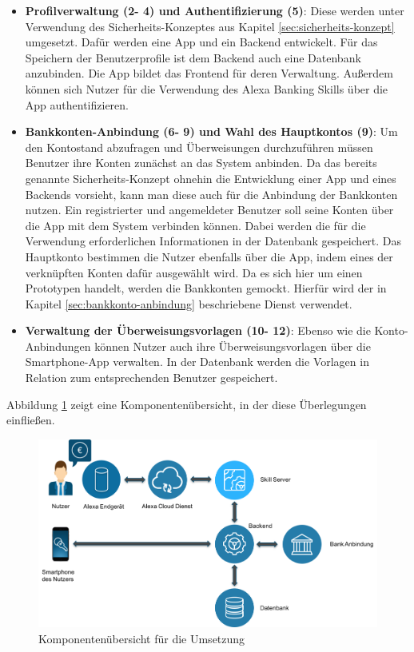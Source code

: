 \begin{itemize}
    \item \textbf{Profilverwaltung (2- 4) und Authentifizierung (5)}: Diese werden unter Verwendung des Sicherheits-Konzeptes aus Kapitel \ref{sec:sicherheits-konzept} umgesetzt. Dafür werden eine App und ein Backend entwickelt. Für das Speichern der Benutzerprofile ist dem Backend auch eine Datenbank anzubinden. Die App bildet das Frontend für deren Verwaltung. Außerdem können sich Nutzer für die Verwendung des Alexa Banking Skills über die App authentifizieren. 
    
    \item \textbf{Bankkonten-Anbindung (6- 9) und Wahl des Hauptkontos (9)}: Um den Kontostand abzufragen und Überweisungen durchzuführen müssen Benutzer ihre Konten zunächst an das System anbinden. Da das bereits genannte Sicherheits-Konzept ohnehin die Entwicklung einer App und eines Backends vorsieht, kann man diese auch für die Anbindung der Bankkonten nutzen. Ein registrierter und angemeldeter Benutzer soll seine Konten über die App mit dem System verbinden können. Dabei werden die für die Verwendung erforderlichen Informationen in der Datenbank gespeichert. Das Hauptkonto bestimmen die Nutzer ebenfalls über die App, indem eines der verknüpften Konten dafür ausgewählt wird. Da es sich hier um einen Prototypen handelt, werden die Bankkonten gemockt. Hierfür wird der in Kapitel \ref{sec:bankkonto-anbindung} beschriebene Dienst verwendet.
    
    \item \textbf{Verwaltung der Überweisungsvorlagen (10- 12)}: Ebenso wie die Konto-Anbindungen können Nutzer auch ihre Überweisungsvorlagen über die Smartphone-App verwalten. In der Datenbank werden die Vorlagen in Relation zum entsprechenden Benutzer gespeichert. 
\end{itemize}

Abbildung \ref{fig:umsetzung-komponenten} zeigt eine Komponentenübersicht, in der diese Überlegungen einfließen.\newpage

\begin{figure}[!htb]
    \centering
    \includegraphics[width=1.0\textwidth]{bilder/4_umsetzungKomponenten.png}
    \caption{Komponentenübersicht für die Umsetzung}
    \label{fig:umsetzung-komponenten}
\end{figure}

